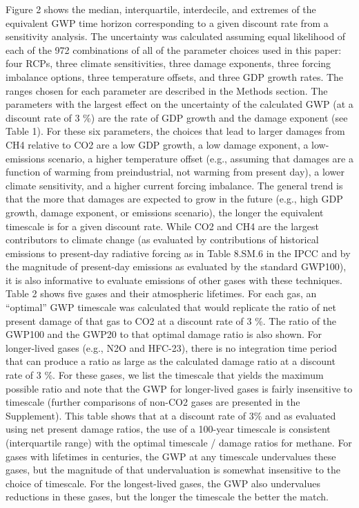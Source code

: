 \documentclass[gc, manuscript]{copernicus}
\begin{document}
Figure 2 shows the median, interquartile, interdecile, and extremes of
the equivalent GWP time horizon corresponding to a given discount rate
from a sensitivity analysis. The uncertainty was calculated assuming
equal likelihood of each of the 972 combinations of all of the parameter
choices used in this paper: four RCPs, three climate sensitivities,
three damage exponents, three forcing imbalance options, three
temperature offsets, and three GDP growth rates. The ranges chosen for
each parameter are described in the Methods section. The parameters with
the largest effect on the uncertainty of the calculated GWP (at a
discount rate of 3 \%) are the rate of GDP growth and the damage
exponent (see Table 1). For these six parameters, the choices that lead
to larger damages from CH4 relative to CO2 are a low GDP growth, a low
damage exponent, a low-emissions scenario, a higher temperature offset
(e.g., assuming that damages are a function of warming from
preindustrial, not warming from present day), a lower climate
sensitivity, and a higher current forcing imbalance. The general trend
is that the more that damages are expected to grow in the future (e.g.,
high GDP growth, damage exponent, or emissions scenario), the longer the
equivalent timescale is for a given discount rate. While CO2 and CH4 are
the largest contributors to climate change (as evaluated by
contributions of historical emissions to present-day radiative forcing
as in Table 8.SM.6 in the IPCC and by the magnitude of present-day
emissions as evaluated by the standard GWP100), it is also informative
to evaluate emissions of other gases with these techniques. Table 2
shows five gases and their atmospheric lifetimes. For each gas, an
``optimal'' GWP timescale was calculated that would replicate the ratio
of net present damage of that gas to CO2 at a discount rate of 3 \%. The
ratio of the GWP100 and the GWP20 to that optimal damage ratio is also
shown. For longer-lived gases (e.g., N2O and HFC-23), there is no
integration time period that can produce a ratio as large as the
calculated damage ratio at a discount rate of 3 \%. For these gases, we
list the timescale that yields the maximum possible ratio and note that
the GWP for longer-lived gases is fairly insensitive to timescale
(further comparisons of non-CO2 gases are presented in the Supplement).
This table shows that at a discount rate of 3\% and as evaluated using
net present damage ratios, the use of a 100-year timescale is consistent
(interquartile range) with the optimal timescale / damage ratios for
methane. For gases with lifetimes in centuries, the GWP at any timescale
undervalues these gases, but the magnitude of that undervaluation is
somewhat insensitive to the choice of timescale. For the longest-lived
gases, the GWP also undervalues reductions in these gases, but the
longer the timescale the better the match.
\end{document}
